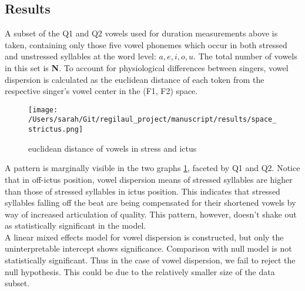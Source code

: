\subsection{Results}
A subset of the Q1 and Q2 vowels used for duration measurements above is taken,  containing only those five vowel phonemes which occur in both stressed and unstressed syllables at the word level: \(a, e, i, o, u\). The total number of vowels in this set is {\bf N}.
To account for physiological differences between singers, vowel dispersion is calculated as the euclidean distance of each token from the respective singer's vowel center in the (F1, F2) space. 


\begin{figure}[htb]
\centering
\texttt{[image: /Users/sarah/Git/regilaul\_project/manuscript/results/space\_strictus.png]}
\caption{euclidean distance of vowels in stress and ictus}
\label{spcstrick}

\end{figure}
A pattern is marginally visible in the two graphs  \ref{spcstrick}, faceted by Q1 and Q2. Notice that in off-ictus position, vowel dispersion means of stressed syllables are higher than those of stressed syllables in ictus position. This indicates that stressed syllables falling off the beat are being compensated for their shortened vowels by way of increased articulation of quality. This pattern, however, doesn't shake out as statistically significant in the model. \\
A linear mixed effects model for vowel dispersion is constructed, but only the uninterpretable intercept shows significance. 
Comparison with null model is not statistically significant. Thus in the case of vowel dispersion, we fail to reject the null hypothesis. This could be due to the relatively smaller size of the data subset. 


